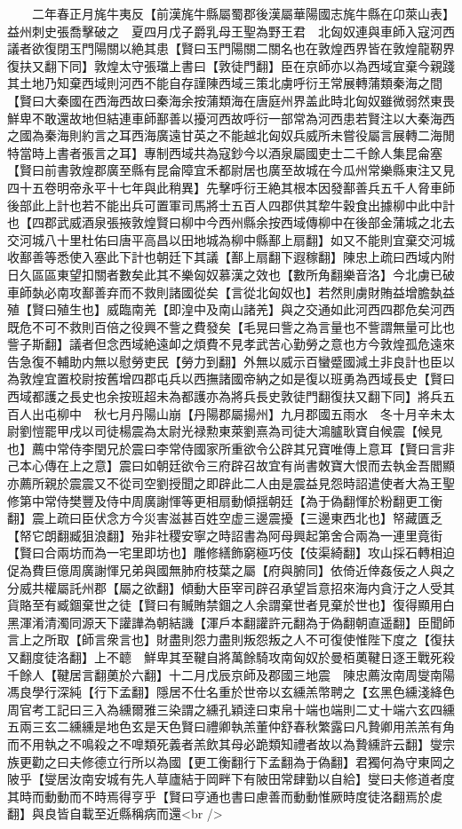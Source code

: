 　　二年春正月旄牛夷反【前漢旄牛縣屬蜀郡後漢屬華陽國志旄牛縣在卬萊山表】益州刺史張喬擊破之　夏四月戊子爵乳母王聖為野王君　北匈奴連與車師入寇河西議者欲復閉玉門陽關以絶其患【賢曰玉門陽關二關名也在敦煌西界皆在敦煌龍靭界復扶又翻下同】敦煌太守張璫上書曰【敦徒門翻】臣在京師亦以為西域宜棄今親踐其土地乃知棄西域則河西不能自存謹陳西域三策北虜呼衍王常展轉蒲類秦海之間【賢曰大秦國在西海西故曰秦海余按蒲類海在唐庭州界盖此時北匈奴雖微弱然東畏鮮卑不敢還故地但結連車師鄯善以擾河西故呼衍一部常為河西患若賢注以大秦海西之國為秦海則約言之耳西海廣遠甘英之不能越北匈奴兵威所未嘗役屬言展轉二海閒特當時上書者張言之耳】專制西域共為寇鈔今以酒泉屬國吏士二千餘人集昆侖塞【賢曰前書敦煌郡廣至縣有昆侖障宜禾都尉居也廣至故城在今瓜州常樂縣東注又見四十五卷明帝永平十七年與此稍異】先擊呼衍王絶其根本因發鄯善兵五千人脅車師後部此上計也若不能出兵可置軍司馬將士五百人四郡供其犂牛穀食出據柳中此中計也【四郡武威酒泉張掖敦煌賢曰柳中今西州縣余按西域傳柳中在後部金蒲城之北去交河城八十里杜佑曰唐平高昌以田地城為柳中縣鄯上扇翻】如又不能則宜棄交河城收鄯善等悉使入塞此下計也朝廷下其議【鄯上扇翻下遐稼翻】陳忠上疏曰西域内附日久區區東望扣關者數矣此其不樂匈奴慕漢之效也【數所角翻樂音洛】今北虜已破車師埶必南攻鄯善弃而不救則諸國從矣【言從北匈奴也】若然則虜財賄益增膽埶益殖【賢曰殖生也】威臨南羌【即湟中及南山諸羌】與之交通如此河西四郡危矣河西既危不可不救則百倍之役興不訾之費發矣【毛晃曰訾之為言量也不訾謂無量可比也訾子斯翻】議者但念西域絶遠卹之煩費不見孝武苦心勤勞之意也方今敦煌孤危遠來告急復不輔助内無以慰勞吏民【勞力到翻】外無以威示百蠻蹙國減土非良計也臣以為敦煌宜置校尉按舊增四郡屯兵以西撫諸國帝納之如是復以班勇為西域長史【賢曰西域都護之長史也余按班超未為都護亦為將兵長史敦徒門翻復扶又翻下同】將兵五百人出屯柳中　秋七月丹陽山崩【丹陽郡屬揚州】九月郡國五雨水　冬十月辛未太尉劉愷罷甲戌以司徒楊震為太尉光禄勲東萊劉熹為司徒大鴻臚耿寶自候震【候見也】薦中常侍李閏兄於震曰李常侍國家所重欲令公辟其兄寶唯傳上意耳【賢曰言非己本心傳在上之意】震曰如朝廷欲令三府辟召故宜有尚書敇寶大恨而去執金吾閻顯亦薦所親於震震又不從司空劉授聞之即辟此二人由是震益見怨時詔遣使者大為王聖修第中常侍樊豐及侍中周廣謝惲等更相扇動傾揺朝廷【為于偽翻惲於粉翻更工衡翻】震上疏曰臣伏念方今災害滋甚百姓空虚三邊震擾【三邊東西北也】帑藏匱乏【帑它朗翻臧狙浪翻】殆非社稷安寧之時詔書為阿母興起第舍合兩為一連里竟街【賢曰合兩坊而為一宅里即坊也】雕修繕飾窮極巧伎【伎渠綺翻】攻山採石轉相迫促為費巨億周廣謝惲兄弟與國無肺府枝葉之屬【府與腑同】依倚近倖姦佞之人與之分威共權屬託州郡【屬之欲翻】傾動大臣宰司辟召承望旨意招來海内貪汙之人受其貨賂至有臧錮棄世之徒【賢曰有贓賄禁錮之人余謂棄世者見棄於世也】復得顯用白黑渾淆清濁同源天下讙譁為朝結譏【渾戶本翻讙許元翻為于偽翻朝直遥翻】臣聞師言上之所取【師言衆言也】財盡則怨力盡則叛怨叛之人不可復使惟陛下度之【復扶又翻度徒洛翻】上不聼　鮮卑其至鞬自將萬餘騎攻南匈奴於曼栢薁鞬日逐王戰死殺千餘人【鞬居言翻薁於六翻】十二月戊辰京師及郡國三地震　陳忠薦汝南周燮南陽馮良學行深純【行下孟翻】隱居不仕名重於世帝以玄纁羔幣聘之【玄黑色纁淺絳色周官考工記曰三入為纁爾雅三染謂之纁孔穎逹曰束帛十端也端則二丈十端六玄四纁五兩三玄二纁纁是地色玄是天色賢曰禮卿執羔董仲舒春秋繁露曰凡贄卿用羔羔有角而不用執之不鳴殺之不嘷類死義者羔飲其母必跪類知禮者故以為贄纁許云翻】燮宗族更勸之曰夫修德立行所以為國【更工衡翻行下孟翻為于偽翻】君獨何為守東岡之陂乎【燮居汝南安城有先人草廬結于岡畔下有陂田常肆勤以自給】燮曰夫修道者度其時而動動而不時焉得亨乎【賢曰亨通也書曰慮善而動動惟厥時度徒洛翻焉於䖍翻】與良皆自載至近縣稱病而還<br />
